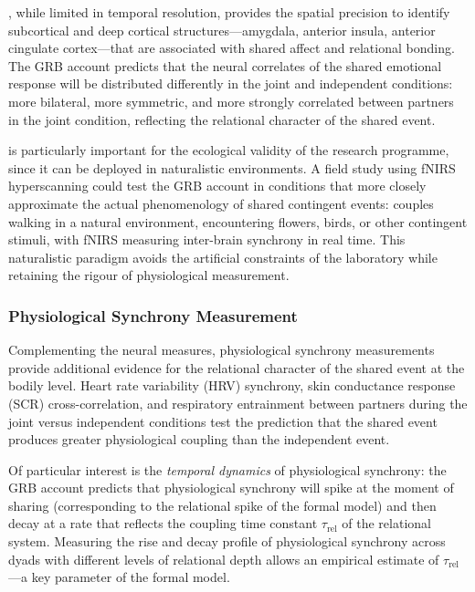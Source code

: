 , while limited in temporal resolution, provides the spatial precision to identify subcortical and deep cortical structures---amygdala, anterior insula, anterior cingulate cortex---that are associated with shared affect and relational bonding. The GRB account predicts that the neural correlates of the shared emotional response will be distributed differently in the joint and independent conditions: more bilateral, more symmetric, and more strongly correlated between partners in the joint condition, reflecting the relational character of the shared event.

 is particularly important for the ecological validity of the research programme, since it can be deployed in naturalistic environments. A field study using fNIRS hyperscanning could test the GRB account in conditions that more closely approximate the actual phenomenology of shared contingent events: couples walking in a natural environment, encountering flowers, birds, or other contingent stimuli, with fNIRS measuring inter-brain synchrony in real time. This naturalistic paradigm avoids the artificial constraints of the laboratory while retaining the rigour of physiological measurement.

\subsubsection{Physiological Synchrony Measurement}
\label{p14:subsubsec:physio}

\noindent
Complementing the neural measures, physiological synchrony measurements provide additional evidence for the relational character of the shared event at the bodily level. Heart rate variability (HRV) synchrony, skin conductance response (SCR) cross-correlation, and respiratory entrainment between partners during the joint versus independent conditions test the prediction that the shared event produces greater physiological coupling than the independent event.

Of particular interest is the \emph{temporal dynamics} of physiological synchrony: the GRB account predicts that physiological synchrony will spike at the moment of sharing (corresponding to the relational spike of the formal model) and then decay at a rate that reflects the coupling time constant $\tau_{\mathrm{rel}}$ of the relational system. Measuring the rise and decay profile of physiological synchrony across dyads with different levels of relational depth allows an empirical estimate of $\tau_{\mathrm{rel}}$---a key parameter of the formal model.

